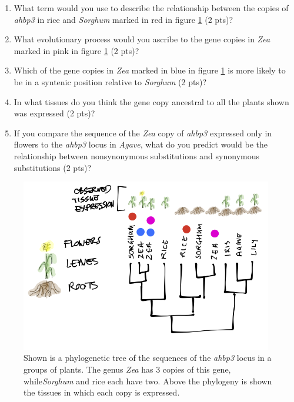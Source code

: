 \documentclass[]{article}
\begin{document}
\begin{enumerate}
\begin{enumerate}
\item What term would you use to describe the relationship between the copies of \emph{ahbp3} in rice and \emph{Sorghum} marked in red in figure \ref{duplicates}  (2 pts)?
\item What evolutionary process would you ascribe to the gene copies in  \emph{Zea} marked in pink in figure \ref{duplicates} (2 pts)?
\item Which of the gene copies in \emph{Zea} marked in blue in figure \ref{duplicates} is more likely to be in a syntenic position relative to \emph{Sorghum} (2 pts)?
\item In what tissues do you think the gene copy ancestral to all the plants shown was expressed (2 pts)?
\item If you compare the sequence of the \emph{Zea }copy of \emph{ahbp3} expressed only in flowers to the \emph{ahbp3} locus in \emph{Agave}, what do you predict would be the relationship between nonsynonymous substitutions and synonymous substitutions (2 pts)?
\end{enumerate}

\begin{figure}[h]
  \begin{center}
   \includegraphics[width=110mm]{images/examfig2.png}
    \caption{Shown is a phylogenetic tree of the sequences of the \emph{ahbp3} locus in a groups of plants. The genus \emph{Zea} has 3 copies of this gene, while\emph{Sorghum} and rice each have two. Above the phylogeny is shown the tissues in which each copy is expressed. } 
\label{duplicates}
  \end{center}
\end{figure}


\end{enumerate}
\end{document}
